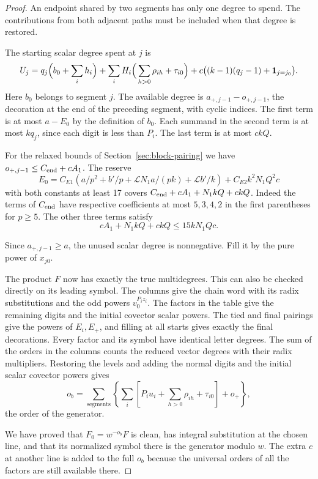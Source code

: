 \begin{proof}
An endpoint shared by two segments has only one degree to spend. The contributions from both adjacent paths must be included when that degree is restored.

The starting scalar degree spent at \(j\) is
\[
 U_j=q_j\Big(b_0+\sum_i h_i\Big)
 +\sum_i H_i\Big(\sum_{h>0}\rho_{ih}+\tau_{i0}\Big)
 + c\big((k-1)(q_j-1)+{\bf1}_{j=j_0}\big).
\]
Here \(b_0\) belongs to segment \(j\). The available degree
is \(a_{+,j-1}-o_{+,j-1}\), the decoration at the end of
the preceding segment, with cyclic indices. The first term is
at most \(a-E_0\) by the definition of \(b_0\). Each summand
in the second term is at most \(kq_j\), since each digit is
less than \(P_i\). The last term is at most \(ckQ\).

For the relaxed bounds of Section~\ref{sec:block-pairing} we have
\(o_{+,j-1}\le C_{\rm end}+c A_1\). The reserve
\[
 E_0=C_{E1}\left(a/p^2+b'/p+
     \mathcal L N_1a/(pk)+\mathcal L b'/k\right)
      + C_{E2} k^2 N_1 Q^2 c
\]
with both constants at least 17 covers
\(C_{\rm end}+cA_1+N_1 kQ+ckQ\).
Indeed the terms of \(C_{\rm end}\) have respective coefficients
at most \(5,3,4,2\) in the first parentheses for \(p\ge5\).
The other three terms satisfy
\[
 cA_1+N_1kQ+ckQ\le15kN_1Qc.
\]

Since \(a_{+,j-1}\ge a\), the unused scalar degree is nonnegative.
Fill it by the pure power of \(x_{j0}\).

The product \(F\) now has exactly the true multidegrees. This can
also be checked directly on its leading symbol. The columns give
the chain word with its radix substitutions and the odd powers
\(v_0^{P_i z_i}\). The factors in the table give the remaining
digits and the initial covector scalar powers. The tied and final
pairings give the powers of \(E_i,E_+\), and filling at all starts
gives exactly the final decorations. Every factor and its symbol
have identical letter degrees. The sum of the orders in the
columns counts the reduced vector degrees with their radix
multipliers. Restoring the levels and adding the normal digits and
the initial scalar covector powers gives
\[
 o_b=\sum_{\text{segments}}\left\{
 \sum_i\left[P_i u_i+\sum_{h>0}\rho_{ih}+\tau_{i0}\right]+o_+
 \right\},
\]
the order of the generator.

We have proved that \(F_0=w^{-o_b}F\)
is clean, has integral substitution at the chosen line, and that
its normalized symbol there is the generator modulo \(w\).
The extra \(c\) at another line is added to the full \(o_b\)
because the universal orders of all the factors are still available there.


\end{proof}
